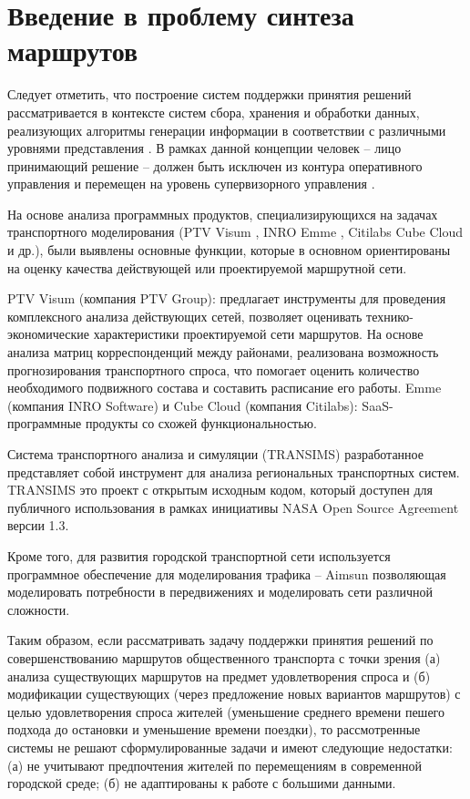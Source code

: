 \chapter{Введение в проблему синтеза маршрутов}
Следует отметить, что построение систем поддержки принятия решений рассматривается в контексте систем 
сбора, хранения и обработки данных, реализующих алгоритмы генерации информации в соответствии с различными 
уровнями представления \cite{bib:4}. В рамках данной концепции человек -- лицо принимающий решение -- 
должен быть исключен из контура оперативного управления и перемещен на уровень супервизорного управления 
\cite{bib:5}.

На основе анализа программных продуктов, специализирующихся на задачах транспортного моделирования 
(PTV Visum \cite{bib:6}, INRO Emme \cite{bib:7}, Citilabs Cube Cloud \cite{bib:8} и др.), были выявлены 
основные функции, которые в основном ориентированы на оценку качества действующей или проектируемой 
маршрутной сети.

PTV Visum (компания PTV Group): предлагает инструменты для проведения комплексного анализа действующих 
сетей, позволяет оценивать технико-экономические характеристики проектируемой сети маршрутов. На основе 
анализа матриц корреспонденций между районами, реализована возможность прогнозирования транспортного спроса, 
что помогает оценить количество необходимого подвижного состава и составить расписание его работы. 
Emme (компания INRO Software) и Cube Cloud (компания Citilabs): SaaS-программные продукты со схожей 
функциональностью.

Система транспортного анализа и симуляции (TRANSIMS) разработанное \cite{transims} представляет собой 
инструмент для анализа региональных транспортных систем. TRANSIMS это проект с открытым исходным кодом, 
который доступен для публичного использования в рамках инициативы NASA Open Source Agreement версии 1.3.

Кроме того, для развития городской транспортной сети используется программное обеспечение для моделирования 
трафика -- Aimsun позволяющая моделировать потребности в передвижениях и моделировать сети различной 
сложности\cite{aimsun}.

Таким образом, если рассматривать задачу поддержки принятия решений по совершенствованию маршрутов 
общественного транспорта с точки зрения (а) анализа существующих маршрутов на предмет удовлетворения 
спроса и (б) модификации существующих (через предложение новых вариантов маршрутов) с целью удовлетворения 
спроса жителей (уменьшение среднего времени пешего подхода до остановки и уменьшение времени поездки), то 
рассмотренные системы не решают сформулированные задачи и имеют следующие недостатки: (а) не учитывают 
предпочтения жителей по перемещениям в современной городской среде; (б) не адаптированы к работе с 
большими данными.

